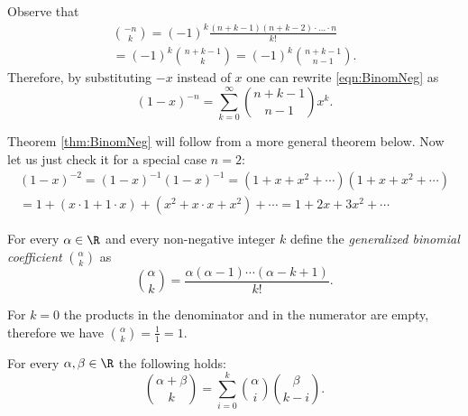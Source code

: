 \begin{page}

\begin{rem}
Observe that
\begin{multline*}
\binom{-n}{k} = (-1)^k \frac{(n+k-1) (n+k-2) \cdot \ldots \cdot n}{k!}\\
= (-1)^k \binom{n+k-1}{k} = (-1)^k \binom{n+k-1}{n-1}.
\end{multline*}
Therefore, by substituting $-x$ instead of $x$ one can rewrite \eqref{eqn:BinomNeg} as
\[
(1-x)^{-n} = \sum_{k=0}^\infty \binom{n+k-1}{n-1} x^k.
\]
\end{rem}

\end{page}

\begin{page}


Theorem \ref{thm:BinomNeg} will follow from a more general theorem below.
Now let us just check it for a special case $n=2$:
\begin{multline*}
(1-x)^{-2} = (1-x)^{-1} (1-x)^{-1} = (1 + x + x^2 + \cdots)(1 + x + x^2 + \cdots)\\
= 1 + (x \cdot 1 + 1 \cdot x) + (x^2 + x \cdot x + x^2) + \cdots
= 1 + 2x + 3x^2 + \cdots
\end{multline*}


\end{page}

\begin{page}

\begin{dfn}
For every $\alpha \in \R$ and every non-negative integer $k$ define the \emph{generalized binomial coefficient} $\binom{\alpha}{k}$ as
\[
\binom{\alpha}{k} = \frac{\alpha(\alpha - 1) \cdots (\alpha - k + 1)}{k!}.
\]
\end{dfn}

\end{page}

\begin{page}

For $k = 0$ the products in the denominator and in the numerator are empty, therefore we have $\binom{\alpha}{k} = \frac{1}{1} = 1$.


\end{page}

\begin{page}

\begin{thm}
\label{thm:Vandermonde}
For every $\alpha, \beta \in \R$ the following holds:
\[
\binom{\alpha + \beta}{k} = \sum_{i=0}^k \binom{\alpha}{i} \binom{\beta}{k-i}.
\]
\end{thm}

\end{page}

